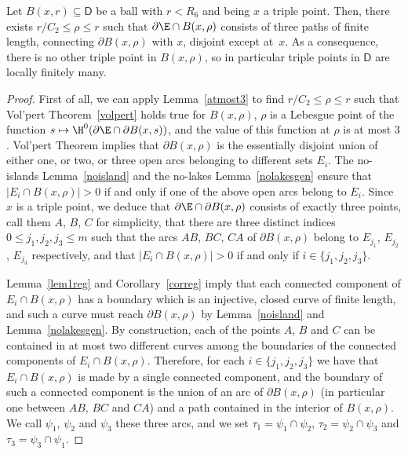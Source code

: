 \begin{lem}\label{dist>R6}
Let $B(x,r)\subseteq \mathsf{D}$ be a ball with $r<R_6$ and being $x$ a triple point. Then, there exists $r/C_2\leq \rho\leq r$ such that $\partial\E\cap B(x,\rho)$ consists of three paths of finite length, connecting $\partial B(x,\rho)$ with $x$, disjoint except at~$x$. As a consequence, there is no other triple point in $B(x,\rho)$, so in particular triple points in $\mathsf{D}$ are locally finitely many.
\end{lem}
\begin{proof}
First of all, we can apply Lemma~\ref{atmost3} to find $r/C_2\leq \rho\leq r$ such that Vol'pert Theorem~\ref{volpert} holds true for $B(x,\rho)$, $\rho$ is a Lebesgue point of the function $s\mapsto \H^0(\partial\E\cap \partial B(x,s))$, and the value of this function at $\rho$ is at most $3$. Vol'pert Theorem implies that $\partial B(x,\rho)$ is the essentially disjoint union of either one, or two, or three open arcs belonging to different sets $E_i$. The no-islands Lemma~\ref{noisland} and the no-lakes Lemma~\ref{nolakesgen} ensure that $|E_i\cap B(x,\rho)|>0$ if and only if one of the above open arcs belong to $E_i$. Since $x$ is a triple point, we deduce that $\partial\E\cap \partial B(x,\rho)$ consists of exactly three points, call them $A$, $ B$, $ C$ for simplicity, that there are three distinct indices $0\leq j_1,j_2,j_3\leq m$ such that the arcs $AB$, $ BC$, $ CA$ of $\partial B(x,\rho)$ belong to $E_{j_1}$, $ E_{j_2}$, $ E_{j_3}$ respectively, and that $|E_i\cap B(x,\rho)|>0$ if and only if $i\in \{j_1,j_2,j_3\}$.

Lemma~\ref{lem1reg} and Corollary~\ref{correg} imply that each connected component of $E_i\cap B(x,\rho)$ has a boundary which is an injective, closed curve of finite length, and such a curve must reach $\partial B(x,\rho)$ by Lemma~\ref{noisland} and Lemma~\ref{nolakesgen}. By construction, each of the points $A$, $B$ and $C$ can be contained in at most two different curves among the boundaries of the connected components of $E_i\cap B(x,\rho)$. Therefore, for each $i\in \{j_1,j_2,j_3\}$ we have that $E_i\cap B(x,\rho)$ is made by a single connected component, and the boundary of such a connected component is the union of an arc of $\partial B(x,\rho)$ (in particular one between $AB,\,BC$ and $CA$) and a path contained in the interior of $B(x,\rho)$. We call $\psi_1$, $\psi_2$ and $\psi_3$ these three arcs, and we set $\tau_1=\psi_1\cap\psi_2$, $\tau_2 = \psi_2\cap\psi_3$ and $\tau_3=\psi_3\cap\psi_1$.


\end{proof}
